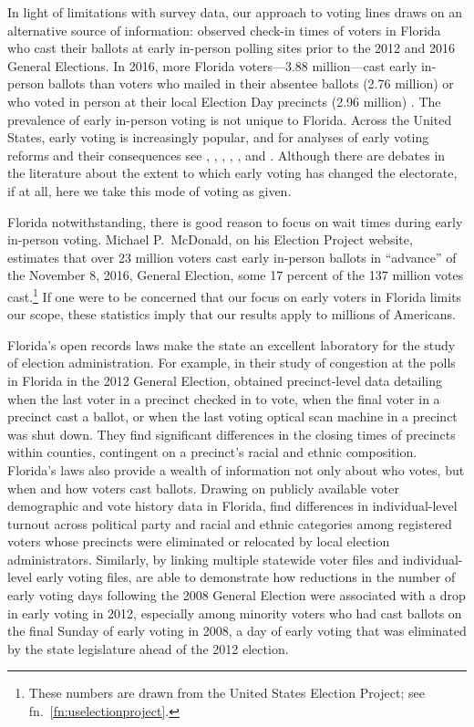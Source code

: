 \documentclass[12pt,titlepage]{article}
\begin{document}
In light of limitations with survey data, our approach to voting lines
draws on an alternative source of information: observed check-in times
of voters in Florida who cast their ballots at early in-person polling
sites prior to the 2012 and 2016 General Elections.  In 2016, more
Florida voters---3.88 million---cast early in-person ballots than
voters who mailed in their absentee ballots (2.76 million) or who
voted in person at their local Election Day precincts (2.96 million)
\citep{FDOS:2016vote}. The prevalence of early in-person voting is not
unique to Florida. Across the United States, early voting is
increasingly popular, and for analyses of early voting reforms and
their consequences see \citet{neelyrichardson:earlyvoting},
\citet{gronke:2012}, \citet{gronke:earlyvotingreforms},
\citet{gronketoffey:psychological}, \citet{gronkebaum:growth}, and
\citet{burdenetal:unanticipated}.  Although there are debates in the
literature about the extent to which early voting has changed the
electorate, if at all, here we take this mode of voting as given.

Florida notwithstanding, there is good reason to focus on wait times
during early in-person voting.  Michael P.\ McDonald, on his Election
Project website, estimates that over 23 million voters cast early
in-person ballots in ``advance'' of the November 8, 2016, General
Election, some 17 percent of the 137 million votes
cast.\footnote{These numbers are drawn from the United States Election
  Project; see fn.\ \ref{fn:uselectionproject}.}  If one were to be
concerned that our focus on early voters in Florida limits our scope,
these statistics imply that our results apply to millions of
Americans.

Florida's open records laws make the state an excellent laboratory for
the study of election administration. For example, in their study of
congestion at the polls in Florida in the 2012 General Election,
\cite{herronsmith:closingtimes} obtained precinct-level data detailing
when the last voter in a precinct checked in to vote, when the final
voter in a precinct cast a ballot, or when the last voting optical
scan machine in a precinct was shut down. They find significant
differences in the closing times of precincts within counties,
contingent on a precinct's racial and ethnic composition.  Florida's
laws also provide a wealth of information not only about who votes,
but when and how voters cast ballots.  Drawing on publicly available
voter demographic and vote history data in Florida,
\cite{amos_etal2017} find differences in individual-level turnout
across political party and racial and ethnic categories among
registered voters whose precincts were eliminated or relocated by
local election administrators.  Similarly, by linking multiple
statewide voter files and individual-level early voting files,
\cite{herron_smith2014} are able to demonstrate how reductions in the
number of early voting days following the 2008 General Election were
associated with a drop in early voting in 2012, especially among
minority voters who had cast ballots on the final Sunday of early
voting in 2008, a day of early voting that was eliminated by the state
legislature ahead of the 2012 election.
\end{document}
